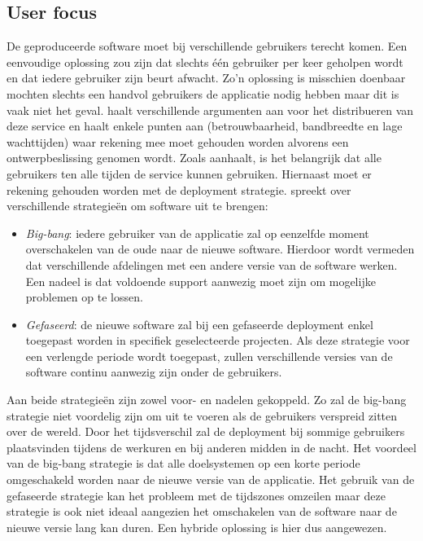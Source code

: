 \subsection{User focus}
De geproduceerde software moet bij verschillende gebruikers terecht komen.
Een eenvoudige oplossing zou zijn dat slechts één gebruiker per keer geholpen wordt en dat iedere gebruiker zijn beurt afwacht.
Zo'n oplossing is misschien doenbaar mochten slechts een handvol gebruikers de applicatie nodig hebben maar dit is vaak niet het geval.
\citet{patterson2008data} haalt verschillende argumenten aan voor het distribueren van deze service en haalt enkele punten aan (betrouwbaarheid, bandbreedte en lage wachttijden) waar rekening mee moet gehouden worden alvorens een ontwerpbeslissing genomen wordt.
Zoals \citet{patterson2008data} aanhaalt, is het belangrijk dat alle gebruikers ten alle tijden de service kunnen gebruiken.
Hiernaast moet er rekening gehouden worden met de deployment strategie.
\citet{munch2012software} spreekt over verschillende strategieën om software uit te brengen:
\begin{itemize}
\item \emph{Big-bang}: iedere gebruiker van de applicatie zal op eenzelfde moment overschakelen van de oude naar de nieuwe software. 
Hierdoor wordt vermeden dat verschillende afdelingen met een andere versie van de software werken. 
Een nadeel is dat voldoende support aanwezig moet zijn om mogelijke problemen op te lossen.
\item \emph{Gefaseerd}: de nieuwe software zal bij een gefaseerde deployment enkel toegepast worden in specifiek geselecteerde projecten.
Als deze strategie voor een verlengde periode wordt toegepast, zullen verschillende versies van de software continu aanwezig zijn onder de gebruikers.
\end{itemize}
Aan beide strategieën zijn zowel voor- en nadelen gekoppeld.
Zo zal de big-bang strategie niet voordelig zijn om uit te voeren als de gebruikers verspreid zitten over de wereld.
Door het tijdsverschil zal de deployment bij sommige gebruikers plaatsvinden tijdens de werkuren en bij anderen midden in de nacht.
Het voordeel van de big-bang strategie is dat alle doelsystemen op een korte periode omgeschakeld worden naar de nieuwe versie van de applicatie. 
Het gebruik van de gefaseerde strategie kan het probleem met de tijdszones omzeilen maar deze strategie is ook niet ideaal aangezien het omschakelen van de software naar de nieuwe versie lang kan duren.
Een hybride oplossing is hier dus aangewezen.

